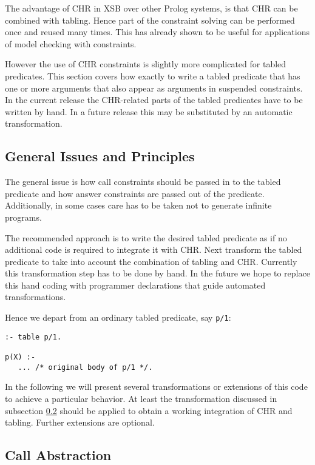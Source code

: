 The advantage of CHR in XSB over other Prolog systems, is that CHR can be
combined with tabling. Hence part of the constraint solving can be performed
once and reused many times. This has already shown to be useful for applications
of model checking with constraints.

However the use of CHR constraints is slightly more complicated for tabled
predicates.  This section covers how exactly to write a tabled
predicate that has one or more arguments that also appear as arguments in
suspended constraints. In the current release the CHR-related parts of the
tabled predicates have to be written by hand. In a future release this may
be substituted by an automatic transformation.

\subsection{General Issues and Principles}

The general issue is how call constraints should be passed in to the tabled
predicate and how answer constraints are passed out of the predicate. Additionally,
in some cases care has to be taken not to generate infinite programs.

The recommended approach is to write the desired tabled predicate as if
no additional code is required to integrate it with CHR.  Next transform
the tabled predicate to take into account the combination of tabling and
CHR. Currently this transformation step has to be done by hand. In the future
we hope to replace this hand coding with programmer declarations that guide
automated transformations.

Hence we depart from an ordinary tabled predicate, say \texttt{p/1}:

\begin{small}
\begin{verbatim}
:- table p/1.

p(X) :- 
   ... /* original body of p/1 */.
\end{verbatim}
\end{small}

In the following we will present several transformations or extensions of
this code to achieve a particular behavior. At least the transformation
discussed in subsection \ref{abstraction} should be applied to obtain a
working integration of CHR and tabling. Further extensions are optional.

\subsection{Call Abstraction} \label{abstraction}


